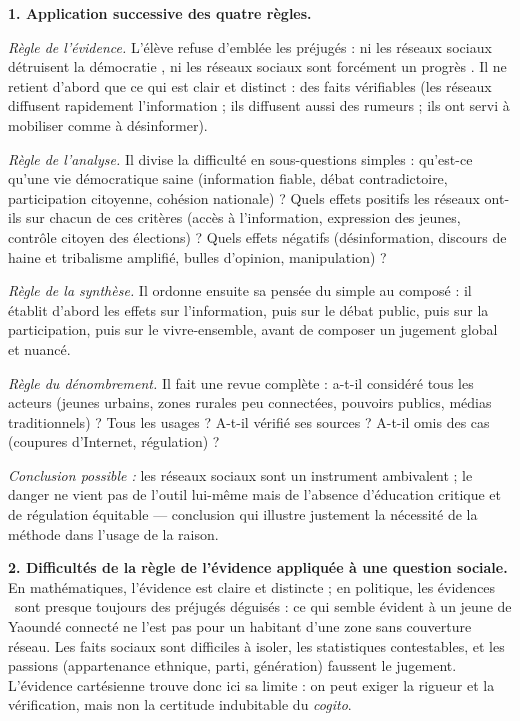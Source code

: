 \documentclass[11pt]{article}
\newcommand{\cle}[1]{{\popxbold\color{popdark}#1}}
\begin{document}
\begin{corrige}
\textbf{1. Application successive des quatre règles.}

\emph{Règle de l'\cle{évidence}.} L'élève refuse d'emblée les \cle{préjugés} : ni \guillemotleft les réseaux sociaux détruisent la démocratie \guillemotright, ni \guillemotleft les réseaux sociaux sont forcément un progrès \guillemotright. Il ne retient d'abord que ce qui est \cle{clair et distinct} : des faits vérifiables (les réseaux diffusent rapidement l'information ; ils diffusent aussi des rumeurs ; ils ont servi à mobiliser comme à désinformer).

\emph{Règle de l'\cle{analyse}.} Il divise la difficulté en sous-questions simples : qu'est-ce qu'une vie démocratique saine (information fiable, débat contradictoire, participation citoyenne, cohésion nationale) ? Quels effets positifs les réseaux ont-ils sur chacun de ces critères (accès à l'information, expression des jeunes, contrôle citoyen des élections) ? Quels effets négatifs (\cle{désinformation}, discours de haine et \cle{tribalisme} amplifié, bulles d'opinion, manipulation) ?

\emph{Règle de la \cle{synthèse}.} Il ordonne ensuite sa pensée du simple au composé : il établit d'abord les effets sur l'information, puis sur le débat public, puis sur la participation, puis sur le \cle{vivre-ensemble}, avant de composer un jugement global et nuancé.

\emph{Règle du \cle{dénombrement}.} Il fait une revue complète : a-t-il considéré tous les acteurs (jeunes urbains, zones rurales peu connectées, pouvoirs publics, médias traditionnels) ? Tous les usages ? A-t-il vérifié ses sources ? A-t-il omis des cas (coupures d'Internet, régulation) ?

\emph{Conclusion possible :} les réseaux sociaux sont un \cle{instrument ambivalent} ; le danger ne vient pas de l'outil lui-même mais de l'absence d'\cle{éducation critique} et de \cle{régulation équitable} — conclusion qui illustre justement la nécessité de la méthode dans l'usage de la raison.

\textbf{2. Difficultés de la règle de l'évidence appliquée à une question sociale.} En mathématiques, l'évidence est \cle{claire et distincte} ; en politique, les \guillemotleft évidences \guillemotright\ sont presque toujours des \cle{préjugés déguisés} : ce qui semble évident à un jeune de Yaoundé connecté ne l'est pas pour un habitant d'une zone sans couverture réseau. Les \cle{faits sociaux} sont difficiles à isoler, les statistiques contestables, et les \cle{passions} (appartenance ethnique, parti, génération) faussent le jugement. L'évidence cartésienne trouve donc ici sa \cle{limite} : on peut exiger la rigueur et la vérification, mais non la certitude indubitable du \emph{cogito}.
\end{corrige}
\end{document}
